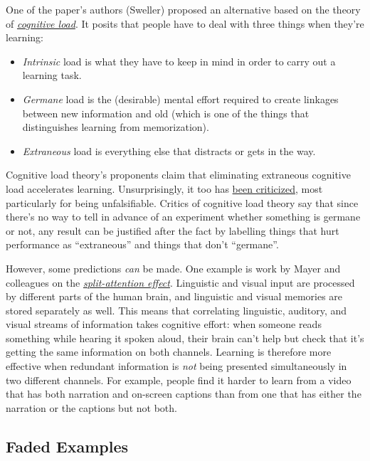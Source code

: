One of the paper's authors (Sweller) proposed an alternative
based on the theory of \emph{\href{https://en.wikipedia.org/wiki/Cognitive\_load}{cognitive load}}.
It posits that people have to deal with three things when they're learning:

\begin{itemize}
\item \emph{Intrinsic} load is what they have to keep in mind in order to carry out a learning task.
\item \emph{Germane} load is the (desirable) mental effort required to create linkages between new information and old
(which is one of the things that distinguishes learning from memorization).
\item \emph{Extraneous} load is everything else that distracts or gets in the way.
\end{itemize}

Cognitive load theory's proponents claim that eliminating extraneous cognitive load accelerates learning.
Unsurprisingly,
it too has \href{https://edtechdev.wordpress.com/2009/11/16/cognitive-load-theory-failure/}{been criticized},
most particularly for being unfalsifiable.
Critics of cognitive load theory say that
since there's no way to tell in advance of an experiment whether something is germane or not,
any result can be justified after the fact
by labelling things that hurt performance as ``extraneous''
and things that don't ``germane''.

However,
some predictions \emph{can} be made.
One example is work by Mayer and colleagues on
the \emph{\href{https://en.wikipedia.org/wiki/Split\_attention\_effect}{split-attention effect}}.
Linguistic and visual input are processed by different parts of the human brain,
and linguistic and visual memories are stored separately as well.
This means that correlating linguistic, auditory, and visual streams of information takes cognitive effort:
when someone reads something while hearing it spoken aloud,
their brain can't help but check that it's getting the same information on both channels.
Learning is therefore more effective when redundant information is \emph{not} being presented simultaneously
in two different channels.
For example,
people find it harder to learn from a video that has both narration and on-screen captions
than from one that has either the narration or the captions but not both.

\subsection*{Faded Examples}

